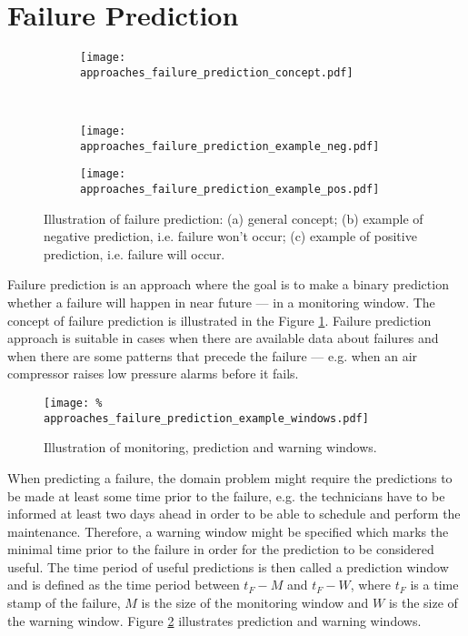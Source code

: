 \section{Failure Prediction}
\label{sec:approaches_failure_prediction}

\begin{figure}
\begin{subfigure}{\linewidth}
\centering
\texttt{[image: approaches\_failure\_prediction\_concept.pdf]}
\caption{}
\end{subfigure}\\[1ex]
\begin{subfigure}{.5\linewidth}
\centering
\texttt{[image: approaches\_failure\_prediction\_example\_neg.pdf]}
\caption{}
\end{subfigure}
\begin{subfigure}{.5\linewidth}
\centering
\texttt{[image: approaches\_failure\_prediction\_example\_pos.pdf]}
\caption{}
\end{subfigure}
\caption{Illustration of failure prediction:
        (a) general concept;
        (b) example of negative prediction, i.e. failure won't occur;
        (c) example of positive prediction, i.e. failure will occur.}
\label{fig:approaches_failure_prediction_illustration}
\end{figure}

Failure prediction is an approach where the goal is to make a binary prediction whether a failure will happen in near future --- in a monitoring window.
The concept of failure prediction is illustrated in the Figure 
\ref{fig:approaches_failure_prediction_illustration}.
Failure prediction approach is suitable in cases when there are available data about failures and when there are some patterns that precede the failure --- e.g. when an air compressor raises low pressure alarms before it fails.

\begin{figure}
    \texttt{[image: \%
        approaches\_failure\_prediction\_example\_windows.pdf]}
    \centering
    \caption{Illustration of monitoring, prediction and warning windows.}
    \label{fig:approaches_failure_prediction_example_windows}
\end{figure}

When predicting a failure, the domain problem might require the predictions to be made at least some time prior to the failure, e.g. the technicians have to be informed at least two days ahead in order to be able to schedule and perform the maintenance.
Therefore, a warning window might be specified which marks the minimal time prior to the failure in order for the prediction to be considered useful.
The time period of useful predictions is then called a prediction window and is defined as the time period between $t_F - M$ and $t_F - W$, where $t_F$ is a time stamp of the failure, $M$ is the size of the monitoring window and $W$ is the size of the warning window.
Figure \ref{fig:approaches_failure_prediction_example_windows} illustrates prediction and warning windows.

